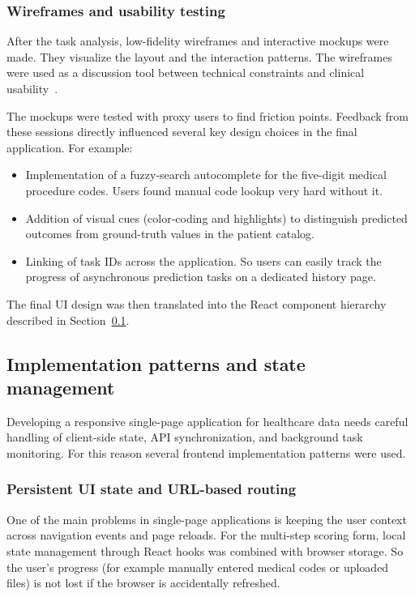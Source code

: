 \subsubsection{Wireframes and usability testing}
After the task analysis, low-fidelity wireframes and interactive mockups were made. They visualize the layout and the interaction patterns. The wireframes were used as a discussion tool between technical constraints and clinical usability~\cite{ucd_ml_dashboard_2023}.

The mockups were tested with proxy users to find friction points. Feedback from these sessions directly influenced several key design choices in the final application. For example:
\begin{itemize}
    \item Implementation of a fuzzy-search autocomplete for the five-digit medical procedure codes. Users found manual code lookup very hard without it.
    \item Addition of visual cues (color-coding and highlights) to distinguish predicted outcomes from ground-truth values in the patient catalog.
    \item Linking of task IDs across the application. So users can easily track the progress of asynchronous prediction tasks on a dedicated history page.
\end{itemize}
The final UI design was then translated into the React component hierarchy described in Section~\ref{subsec:implementation_patterns}.


\subsection{Implementation patterns and state management}
\label{subsec:implementation_patterns}

Developing a responsive single-page application for healthcare data needs careful handling of client-side state, API synchronization, and background task monitoring. For this reason several frontend implementation patterns were used.

\subsubsection{Persistent UI state and URL-based routing}
One of the main problems in single-page applications is keeping the user context across navigation events and page reloads. For the multi-step scoring form, local state management through React hooks was combined with browser storage. So the user's progress (for example manually entered medical codes or uploaded files) is not lost if the browser is accidentally refreshed.

